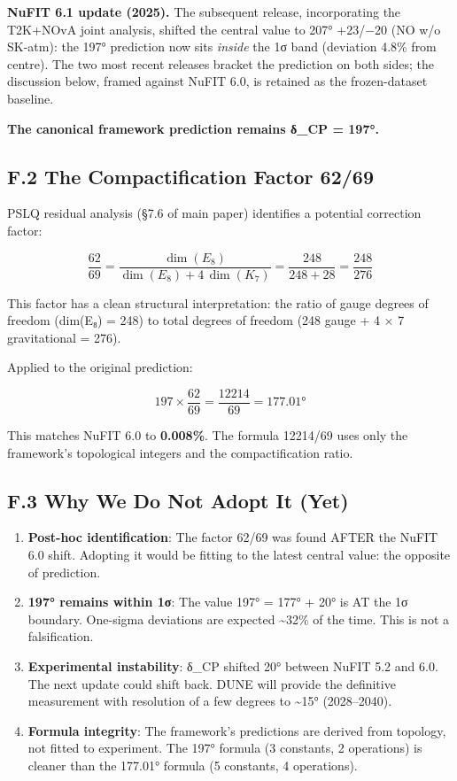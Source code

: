 \documentclass[11pt,a4paper]{article}
\begin{document}
\textbf{NuFIT 6.1 update (2025).} The subsequent release, incorporating the T2K+NOvA joint analysis, shifted the central value to 207° +23/−20 (NO w/o SK-atm): the 197° prediction now sits \emph{inside} the 1σ band (deviation 4.8\% from centre). The two most recent releases bracket the prediction on both sides; the discussion below, framed against NuFIT 6.0, is retained as the frozen-dataset baseline.

\textbf{The canonical framework prediction remains δ\_\allowbreak{}CP = 197°.}

\subsection{F.2 The Compactification Factor 62/69}\label{f.2-the-compactification-factor-6269}

PSLQ residual analysis (§7.6 of main paper) identifies a potential correction factor:

\[\frac{62}{69} = \frac{\dim(E_8)}{\dim(E_8) + 4\,\dim(K_7)} = \frac{248}{248 + 28} = \frac{248}{276}\]

This factor has a clean structural interpretation: the ratio of gauge degrees of freedom (dim(E₈) = 248) to total degrees of freedom (248 gauge + 4 × 7 gravitational = 276).

Applied to the original prediction:

\[197 \times \frac{62}{69} = \frac{12214}{69} = 177.01°\]

This matches NuFIT 6.0 to \textbf{0.008\%}. The formula 12214/69 uses only the framework's topological integers and the compactification ratio.

\subsection{F.3 Why We Do Not Adopt It (Yet)}\label{f.3-why-we-do-not-adopt-it-yet}

\begin{enumerate}
\def\labelenumi{\arabic{enumi}.}
\item
  \textbf{Post-hoc identification}: The factor 62/69 was found AFTER the NuFIT 6.0 shift. Adopting it would be fitting to the latest central value: the opposite of prediction.
\item
  \textbf{197° remains within 1σ}: The value 197° = 177° + 20° is AT the 1σ boundary. One-sigma deviations are expected \textasciitilde32\% of the time. This is not a falsification.
\item
  \textbf{Experimental instability}: δ\_\allowbreak{}CP shifted 20° between NuFIT 5.2 and 6.0. The next update could shift back. DUNE will provide the definitive measurement with resolution of a few degrees to \textasciitilde15° (2028--2040).
\item
  \textbf{Formula integrity}: The framework's predictions are derived from topology, not fitted to experiment. The 197° formula (3 constants, 2 operations) is cleaner than the 177.01° formula (5 constants, 4 operations).
\end{enumerate}
\end{document}
